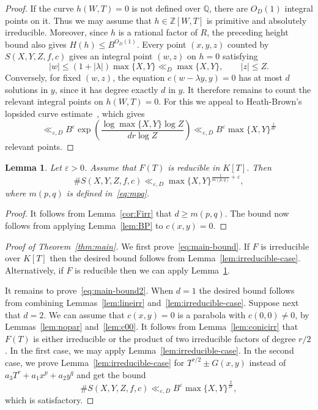 \documentclass[a4paper,11pt,twoside,reqno]{amsart}
\newtheorem{lemma}[theorem]{Lemma}
\theoremstyle{definition}
\theoremstyle{remark}
\numberwithin{equation}{section}
\newcommand\eps{\varepsilon}
\newcommand\ve{\varepsilon}
\newcommand\Z{\mathbb{Z}}
\newcommand\Q{\mathbb{Q}}
\newcommand\1{\mathbf{1}}
\renewcommand{\leq}{\leqslant}
\renewcommand{\geq}{\geqslant}
\begin{document}
\begin{proof}
 If the curve 
 $h(W,T)=0$ is not defined over $\Q$, there are $O_{D}(1)$ integral points on it. Thus we may assume that $h\in\Z[W,T]$ is primitive and absolutely irreducible. 
 Moreover, since $h$
is a rational factor of $R$, the preceding height bound also gives
$H(h)\leq B^{O_D(1)}$.
Every point $(x,y,z)$ counted by $S(X,Y,Z,f,c)$ gives an integral
point $(w,z)$ on $h=0$ satisfying
\[
|w|\leq (1+|\lambda|)\max\{X,Y\}\ll_D \max\{X,Y\},
\qquad
|z|\leq Z.
\]
Conversely, for fixed $(w,z)$, the equation
$c(w-\lambda y,y)=0$
has at most $d$ solutions in $y$, since it has degree exactly $d$
in $y$. It therefore remains to count the relevant integral points
on $h(W,T)=0$.
For this we appeal to Heath-Brown’s lopsided curve estimate~\cite[Theorem~15]{HeathBrown}, which gives 
 \[
\ll_{\ve,D} B^{\ve}\exp\left(\frac{\log \max\{X,Y\}\log Z}{dr\log Z}\right)
\ll_{\ve,D}B^{\ve}\max\{X,Y\}^{\frac{1}{dr}}
 \]
relevant points.
\end{proof}

\begin{lemma}\label{lem:kummer-case}
	Let $\ve>0$. Assume that $F(T)$ is reducible in $K[T]$. Then
\[\#S(X,Y,Z,f,c)\ll_{\eps,D}\max\{X,Y\}^{\frac{1}{m(p,q)}+\eps},
\]
where $m(p,q)$ is defined in~\eqref{eq:mpq}.
\end{lemma}

\begin{proof}
It follows from Lemma~\ref{cor:Firr} that $d\geq m(p,q)$. The bound now follows from applying Lemma~\ref{lem:BP} to $c(x,y)=0$.
\end{proof}

\begin{proof}[Proof of Theorem~\ref{thm:main}]
We first prove~\eqref{eq:main-bound}. If $F$ is irreducible over $K[T]$ then 
the desired bound follows from Lemma~\ref{lem:irreducible-case}. 
Alternatively, if $F$ is reducible then we can apply Lemma~\ref{lem:kummer-case}.

It remains to prove~\eqref{eq:main-bound2}. When $d=1$ the desired bound follows from combining 
 Lemmas~\ref{lem:lineirr} and~\ref{lem:irreducible-case}.
 Suppose next that $d=2$. We can assume that $c(x,y)=0$ is a parabola
 with $c(0,0)\neq0$, by Lemmas~\ref{lem:nopar} and~\ref{lem:c00}. It follows from Lemma~\ref{lem:conicirr} that $F(T)$ is either irreducible or the product of two irreducible factors of degree $r/2$. In the first case, we may apply Lemma~\ref{lem:irreducible-case}. In the second case, we prove Lemma~\ref{lem:irreducible-case} for $T^{r/2}\pm G(x,y)$ instead of $a_3T^r+a_1x^p+a_2y^q$ and get the bound
 \[
 \#S(X,Y,Z,f,c)\ll_{\eps,D}B^{\ve}\max\{X,Y\}^{\frac{2}{2r}},
 \]
 which is satisfactory.
\end{proof}
\end{document}
